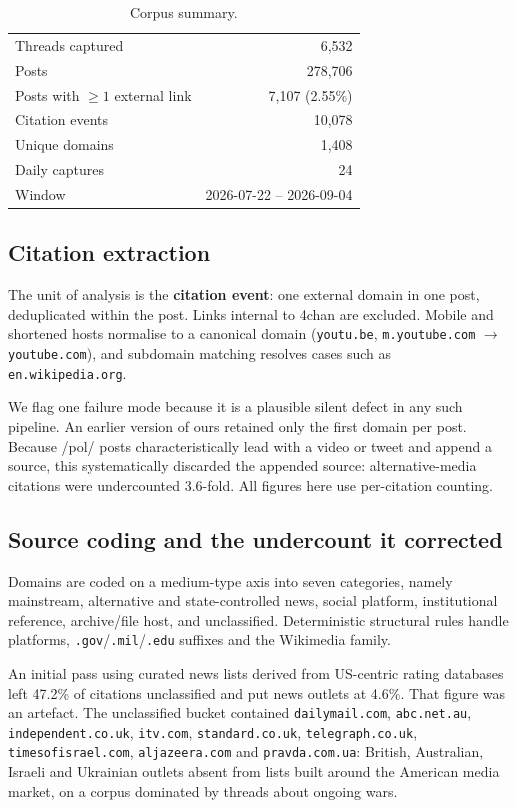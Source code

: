 \documentclass[11pt]{article}
\begin{document}
\begin{table}[t]
\centering
\small
\begin{tabular}{lr}
\toprule
Threads captured & 6{,}532 \\
Posts & 278{,}706 \\
Posts with $\geq 1$ external link & 7{,}107 (2.55\%) \\
Citation events & 10{,}078 \\
Unique domains & 1{,}408 \\
Daily captures & 24 \\
Window & 2026-07-22 -- 2026-09-04 \\
\bottomrule
\end{tabular}
\caption{Corpus summary.}
\label{tab:corpus}
\end{table}

\subsection{Citation extraction}

The unit of analysis is the \textbf{citation event}: one external domain in one
post, deduplicated within the post. Links internal to 4chan are excluded.
Mobile and shortened hosts normalise to a canonical domain
(\texttt{youtu.be}, \texttt{m.youtube.com} $\rightarrow$ \texttt{youtube.com}),
and subdomain matching resolves cases such as \texttt{en.wikipedia.org}.

We flag one failure mode because it is a plausible silent defect in any such
pipeline. An earlier version of ours retained only the first domain per post.
Because /pol/ posts characteristically lead with a video or tweet and append a
source, this systematically discarded the appended source: alternative-media
citations were undercounted 3.6-fold. All figures here use per-citation counting.

\subsection{Source coding and the undercount it corrected}
\label{sec:coding}

Domains are coded on a medium-type axis into seven categories, namely mainstream,
alternative and state-controlled news, social platform, institutional reference,
archive/file host, and unclassified. Deterministic structural rules handle
platforms, \texttt{.gov}/\texttt{.mil}/\texttt{.edu} suffixes and the Wikimedia
family.

An initial pass using curated news lists derived from US-centric rating
databases left 47.2\% of citations unclassified and put news outlets at 4.6\%.
That figure was an artefact. The unclassified bucket contained
\texttt{dailymail.com}, \texttt{abc.net.au}, \texttt{independent.co.uk},
\texttt{itv.com}, \texttt{standard.co.uk}, \texttt{telegraph.co.uk},
\texttt{timesofisrael.com}, \texttt{aljazeera.com} and \texttt{pravda.com.ua}:
British, Australian, Israeli and Ukrainian outlets absent from lists built
around the American media market, on a corpus dominated by threads about
ongoing wars.
\end{document}
